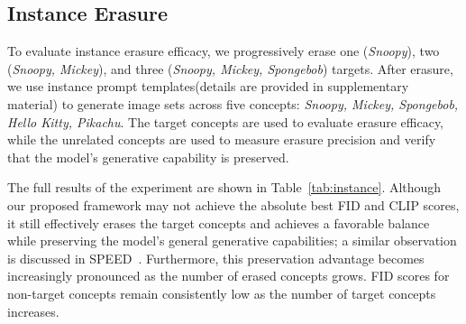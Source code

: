 \documentclass[letterpaper]{article} %
\begin{document}
\subsection{Instance Erasure}
To evaluate instance erasure efficacy, we progressively erase one (\textit{Snoopy}), two (\textit{Snoopy, Mickey}), and three (\textit{Snoopy, Mickey, Spongebob}) targets. After erasure, we use instance prompt templates(details are provided in supplementary material) to generate image sets across five concepts: \textit{Snoopy, Mickey, Spongebob, Hello Kitty, Pikachu}. The target concepts are used to evaluate erasure efficacy, while the unrelated concepts are used to measure erasure precision and verify that the model's generative capability is preserved. 

The full results of the experiment are shown in Table~\ref{tab:instance}. Although our proposed framework may not achieve the absolute best FID and CLIP scores, it still effectively erases the target concepts and achieves a favorable balance while preserving the model's general generative capabilities; a similar observation is discussed in SPEED~\cite{SPEED}. Furthermore, this preservation advantage becomes increasingly pronounced as the number of erased concepts grows. FID scores for non-target concepts remain consistently low as the number of target concepts increases.
\end{document}
